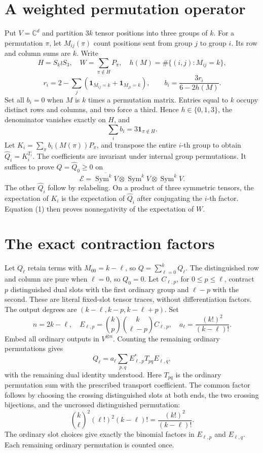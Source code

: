 \documentclass[11pt]{article}
\newcommand{\Sym}{\operatorname{Sym}}
\begin{document}
\section{A weighted permutation operator}
Put \(V=\mathbb C^d\) and partition \(3k\) tensor positions into three groups of \(k\). For a permutation \(\pi\), let \(M_{ij}(\pi)\) count positions sent from group \(j\) to group \(i\). Its row and column sums are \(k\). Write
\[
 H=S_k\wr S_3,\quad W=\sum_{\pi\notin H}P_\pi,\quad
 h(M)=\#\{(i,j):M_{ij}=k\},
\]
\[
 r_i=2-\sum_j(\mathbf1_{M_{ij}=k}+\mathbf1_{M_{ji}=k}),\qquad
 b_i=\frac{3r_i}{6-2h(M)}.
\]
Set all \(b_i=0\) when \(M\) is \(k\) times a permutation matrix. Entries equal to \(k\) occupy distinct rows and columns, and two force a third. Hence \(h\in\{0,1,3\}\), the denominator vanishes exactly on \(H\), and
\[
                         \sum_i b_i=3\mathbf1_{\pi\notin H}.       \tag{1}
\]
Let \(K_i=\sum_\pi b_i(M(\pi))P_\pi\), and transpose the entire \(i\)-th group to obtain \(\widehat Q_i=K_i^{T_i}\). The coefficients are invariant under internal group permutations. It suffices to prove \(Q=\widehat Q_0\ge0\) on
\[
        \mathcal E=\overline{\Sym^kV}\otimes\Sym^kV\otimes\Sym^kV. \tag{2}
\]
The other \(\widehat Q_i\) follow by relabeling. On a product of three symmetric tensors, the expectation of \(K_i\) is the expectation of \(\widehat Q_i\) after conjugating the \(i\)-th factor. Equation (1) then proves nonnegativity of the expectation of \(W\).

\section{The exact contraction factors}
Let \(Q_\ell\) retain terms with \(M_{00}=k-\ell\), so \(Q=\sum_{\ell=0}^kQ_\ell\). The distinguished row and column are pure when \(\ell=0\), so \(Q_0=0\).
Let \(C_{\ell,p}\), for \(0\le p\le\ell\), contract \(p\) distinguished dual slots with the first ordinary group and \(\ell-p\) with the second. These are literal fixed-slot tensor traces, without differentiation factors. The output degrees are
\((k-\ell,k-p,k-\ell+p)\). Set
\[
 n=2k-\ell,\quad
 E_{\ell,p}=\binom{k}{p}\binom{k}{\ell-p}C_{\ell,p},\quad
 a_\ell=\frac{(k!)^2}{(k-\ell)!}.
\]
Embed all ordinary outputs in \(V^{\otimes n}\). Counting the remaining ordinary permutations gives
\[
                 Q_\ell=a_\ell\sum_{p,q} E_{\ell,p}^*T_{pq}E_{\ell,q}, \tag{3}
\]
with the remaining dual identity understood. Here \(T_{pq}\) is the ordinary permutation sum with the prescribed transport coefficient. The common factor follows by choosing the crossing distinguished slots at both ends, the two crossing bijections, and the uncrossed distinguished permutation:
\[
       \binom{k}{\ell}^{\!2}(\ell!)^2(k-\ell)!
                         =\frac{(k!)^2}{(k-\ell)!}.
\]
The ordinary slot choices give exactly the binomial factors in \(E_{\ell,p}\) and \(E_{\ell,q}\). Each remaining ordinary permutation is counted once.
\end{document}
